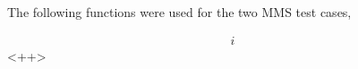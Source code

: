 The following functions were used for the two MMS test cases,

\begin{align}
    i
    \label{<+label+>}
\end{align}<++>

